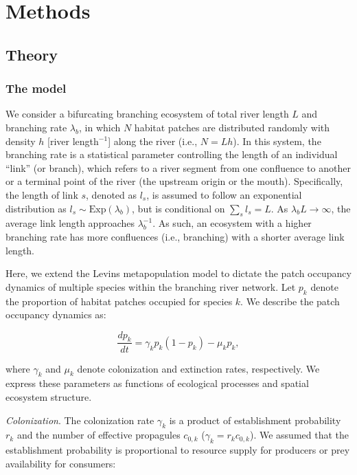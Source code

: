 \documentclass[11pt, class=article, crop=false]{standalone}
\begin{document}
\section{Methods}

\subsection{Theory}

\subsubsection{The model}

We consider a bifurcating branching ecosystem of total river length $L$ and branching rate $\lambda_b$, in which $N$ habitat patches are distributed randomly with density $h$ [river length$^{-1}$] along the river (i.e., $N = Lh$).
In this system, the branching rate is a statistical parameter controlling the length of an individual ``link'' (or branch), which refers to a river segment from one confluence to another or a terminal point of the river (the upstream origin or the mouth).
Specifically, the length of link $s$, denoted as $l_s$, is assumed to follow an exponential distribution as $l_s \sim \mbox{Exp}(\lambda_b)$, but is conditional on $\sum_s l_s = L$.
As $\lambda_b L \rightarrow \infty$, the average link length approaches $\lambda_b^{-1}$.
As such, an ecosystem with a higher branching rate has more confluences (i.e., branching) with a shorter average link length.

Here, we extend the Levins metapopulation model to dictate the patch occupancy dynamics of multiple species within the branching river network.
Let $p_k$ denote the proportion of habitat patches occupied for species $k$.
We describe the patch occupancy dynamics as:

\begin{equation}
    \frac{dp_k}{dt} = \gamma_{k} p_k (1 - p_k) - \mu_k p_k,
\end{equation}

where $\gamma_k$ and $\mu_k$ denote colonization and extinction rates, respectively.
We express these parameters as functions of ecological processes and spatial ecosystem structure.

\textit{Colonization}. The colonization rate $\gamma_k$ is a product of establishment probability $r_k$ and the number of effective propagules $c_{0,k}$ ($\gamma_k = r_k c_{0,k}$).
We assumed that the establishment probability is proportional to resource supply for producers or prey availability for consumers:
\end{document}
